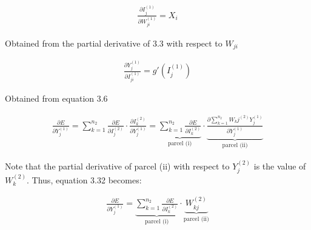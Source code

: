 \documentclass[
  12pt,
]{report}
\begin{document}
\vspace{-1em}

\begin{equation}
\begin{aligned}
\frac{\partial I_j^{(1)}}{\partial W_{ji}^{(1)}} = X_i
\label{eq:equation 3.30}
\end{aligned}
\end{equation} \vspace{-1em}

Obtained from the partial derivative of 3.3 with respect to \(W_{ji}\)

\vspace{-1em}

\begin{equation}
\begin{aligned}
\frac{\partial Y_j^{(1)}}{\partial I_{ji}^{(1)}} = g'(I_j^{(1)})
\label{eq:equation 3.31}
\end{aligned}
\end{equation} \vspace{-1em}

Obtained from equation 3.6

\vspace{-1em}

\begin{equation}
\begin{aligned}
\frac{\partial E}{\partial Y_j^{(1)}} = \sum_{k=1}^{n_2} \frac{\partial E}{\partial I_j^{(2)}} \cdot \frac{\partial I_k^{(2)}}{\partial Y_j^{(1)}} = \underbrace{\sum_{k=1}^{n_2} \frac{\partial E}{\partial I_k^{(2)}}}_{\text{parcel (i)}} \cdot \underbrace{\frac{\partial \sum_{k=1}^{n_2} W_kj^{(2)} Y_j^{(1)}}{\partial Y_j^{(1)}}}_{\text{parcel (ii)}}
\label{eq:equation 3.32}
\end{aligned}
\end{equation} \vspace{-1em}

Note that the partial derivative of parcel (ii) with respect to
\(Y_j^{(2)}\) is the value of \(W_k^{(2)}\). Thus, equation 3.32
becomes:

\vspace{-1em}

\begin{equation}
\begin{aligned}
\frac{\partial E}{\partial Y_j^{(1)}} = \underbrace{\sum_{k=1}^{n_2} \frac{\partial E}{\partial I_k^{(2)}}}_{\text{parcel (i)}} \cdot \underbrace{W_{kj}^{(2)}}_{\text{parcel (ii)}}
\label{eq:equation 3.33}
\end{aligned}
\end{equation} \vspace{-1em}
\end{document}
